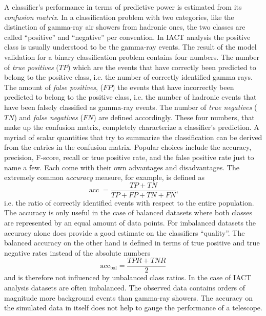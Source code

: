 A classifier's performance in terms of predictive power is estimated from its \emph{confusion matrix}.   
In a classification problem with two categories, like the distinction of gamma-ray air showers from hadronic ones, 
the two classes are called  \enquote{positive} and \enquote{negative} per convention. 
In IACT analysis the positive class is usually understood to be the gamma-ray events.  
The result of the model validation for a binary classification problem contains four numbers.
The number of \emph{true positives} ($TP$) which are the events that have correctly been predicted to belong to the positive class, i.e. the number of correctly identified gamma rays.
The amount of \emph{false positives}, ($FP$) the events that have incorrectly been predicted to belong to the positive class, i.e. the number of hadronic events 
that have been falsely classified as gamma-ray events. The number of \emph{true negatives} ($TN$) and \emph{false negatives} ($FN$) are defined accordingly.
These four numbers, that make up the confusion matrix, completely characterize a classifier's prediction.
A myriad of scalar quantities that try to summarize the classification can be derived from the entries in the confusion matrix. 
Popular choices include the accuracy, precision, F-score, recall or true positive rate, and the false positive rate just to name a few. 
Each come with their own advantages and disadvantages. 
The extremely common \emph{accuracy} measure, for example, is defined 
as 
\begin{equation*}
    \operatorname{acc} = \frac{TP + TN}{TP + FP + TN + FN},    
\end{equation*}
i.e. the ratio of correctly identified events with respect to the entire population.
The accuracy is only useful in the case of balanced datasets where both classes are represented by an equal amount of data points.
For imbalanced datasets the accuracy alone does provide a good estimate on the classifiers \enquote{quality}.
The balanced accuracy on the other hand is defined in terms of true positive and true negative rates instead of the absolute numbers
\begin{equation*}
    \operatorname{acc_{\text{bal}}} = \frac{TPR + TNR}{2}   
\end{equation*}
and is therefore not influenced by unbalanced class ratios.
In the case of IACT analysis datasets are often imbalanced. 
The observed data contains orders of magnitude more background events than gamma-ray showers. 
The accuracy on the simulated data in itself does not help to gauge the performance of a telescope. 


